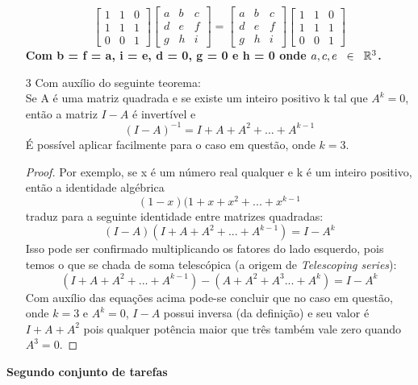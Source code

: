 \documentclass[11pt]{article}
\begin{document}
\begin{itemize}
$$
\begin{bmatrix}
1&1&0\\1&1&1\\0&0&1
\end{bmatrix}
\begin{bmatrix}
a&b&c\\d&e&f\\g&h&i
\end{bmatrix}
=
\begin{bmatrix}
a&b&c\\d&e&f\\g&h&i
\end{bmatrix}
\begin{bmatrix}
1&1&0\\1&1&1\\0&0&1
\end{bmatrix}
$$
\textbf{Com b = f = a, i = e, d = 0, g = 0 e h = 0 onde $a,c,e\hspace{2mm}\in\hspace{2mm}\mathbb{R}^3$.}

\item[3] Com auxílio do seguinte teorema:
\\ Se A é uma matriz quadrada e se existe um inteiro positivo k tal que $A^k=0$, então a matriz $I-A$ é invertível e $$(I-A)^{-1} = I + A + A^2 + ... + A^{k-1}$$
É possível aplicar facilmente para o caso em questão, onde $k=3$.
\begin{proof}
Por exemplo, se x é um número real qualquer e k é um inteiro positivo, então a identidade algébrica $$(1-x)(1+x+x^2+...+x^{k-1}$$ traduz para a seguinte identidade entre matrizes quadradas:
$$
(I-A)(I+A+A^2+...+A^{k-1})=I-A^k
$$
Isso pode ser confirmado multiplicando os fatores do lado esquerdo, pois temos o que se chada de soma telescópica (a origem de \textit{Telescoping series}):
$$
(I+A+A^2+...+A^{k-1}) - (A+A^2+A^3...+A^k) = I-A^k
$$
Com auxílio das equações acima pode-se concluir que no caso em questão, onde $k=3$ e $A^k=0$,      $I-A$ possui inversa (da definição) e seu valor é $I + A + A^2$ pois qualquer potência maior que três também vale zero quando $A^3=0$.\qedhere
\end{proof}
\end{itemize}

\begin{center}
{\LARGE \textbf{Segundo conjunto de tarefas}}
\end{center}
\end{document}
